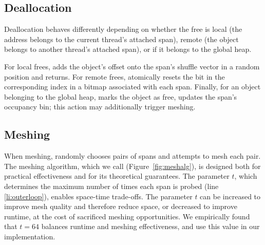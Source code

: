 \subsection{Deallocation}
\label{sec:deallocation-algorithm}

Deallocation behaves differently depending on whether the free is
local (the address belongs to the current thread's attached span),
remote (the object belongs to another thread's attached span), or if
it belongs to the global heap.

For local frees, \Mesh{} adds the object's offset onto the span's
shuffle vector in a random position and returns. For remote frees,
\Mesh{} atomically resets the bit in the corresponding index in a
bitmap associated with each span. Finally, for an object belonging to
the global heap, \Mesh{} marks the object as free, updates the span's
occupancy bin; this action may additionally trigger meshing.




\subsection{Meshing}
\label{sec:meshing-algorithm}

When meshing, \Mesh{} randomly chooses pairs of spans and attempts to
mesh each pair. The meshing algorithm, which we call \sm
(Figure~\ref{fig:meshalg}), is designed both for practical
effectiveness and for its theoretical guarantees.  The parameter $t$,
which determines the maximum number of times each span is probed (line
\ref{li:outerloop}), enables space-time trade-offs. The parameter $t$
can be increased to improve mesh quality and therefore reduce space,
or decreased to improve runtime, at the cost of sacrificed meshing
opportunities. We empirically found that $t=64$ balances runtime and
meshing effectiveness, and use this value in our implementation.

